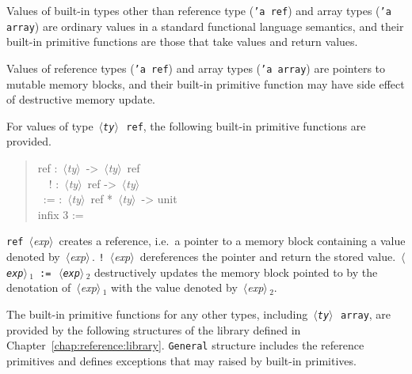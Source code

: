 \documentclass{jbook}
\newcommand{\code}[1]{\mbox{\large\tt #1}}
\newcommand{\nonterm}[1]{\mbox{$\,\langle$}{\it #1}\mbox{$\rangle\,$}}
\newcommand{\term}[1]{\mbox{{\tt #1}}}
\newenvironment{program}{\begin{quote}\begin{tt}}%
                        {\end{tt}\end{quote}}
\begin{document}
	Values of built-in types other than reference type (\term{'a ref}) and
array types (\term{'a array}) are ordinary values in a standard
functional language semantics, and their built-in primitive functions
are those that take values and return values.

	Values of reference types (\term{'a ref}) and array types (\term{'a
array}) are pointers to mutable memory blocks, and their built-in
primitive function may have side effect of destructive memory update.

	For values of type \code{\nonterm{ty} ref}, the following
built-in primitive functions are provided.
\begin{program}
ref : \nonterm{ty} -> \nonterm{ty} ref\\
\ \ ! : \nonterm{ty} ref -> \nonterm{ty}\\
\ :=  : \nonterm{ty} ref * \nonterm{ty}  -> unit\\
infix 3 :=
\end{program}
 	\code{ref} \nonterm{exp} creates a reference, i.e.\ a pointer to
a memory block containing a value denoted by \nonterm{exp}.
 	\code{!} \nonterm{exp} dereferences the pointer and return the
stored value.
 	\code{\nonterm{exp}$_1$ := \nonterm{exp}$_2$} destructively
updates the memory block pointed to by the denotation of
\nonterm{exp}$_1$ with the value denoted by \nonterm{exp}$_2$.
 	
	The built-in primitive functions for any other types, including 
\code{\nonterm{ty} array}, are provided by the following structures of
the library defined in Chapter~\ref{chap:reference:library}.
 	\term{General} structure includes the reference primitives and 
defines exceptions that may raised by built-in primitives.

\fi%
\end{document}

